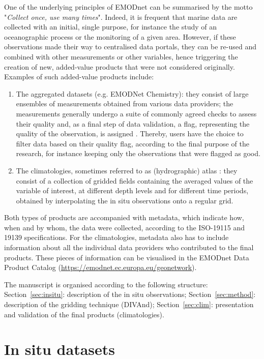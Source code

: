 \documentclass[essd,manuscript]{copernicus}
\begin{document}
One of the underlying principles of EMODnet can be summarised by the motto "\textit{Collect once, use many times}". Indeed, it is frequent that marine data are collected with an initial, single purpose, for instance the study of an oceanographic process or the monitoring of a given area. However, if these observations made their way to centralised data portals, they can be re-used and combined with other measurements or other variables, hence triggering the creation of new, added-value products that were not considered originally. Examples of such added-value products include:
\begin{enumerate}
\item The aggregated datasets (e.g. EMODNet Chemistry): they consist of large ensembles of measurements obtained from various data providers; the measurements generally undergo a suite of commonly agreed checks to assess their quality and, as a final step of data validation, a flag, representing the quality of the observation, is assigned \citep{Lipizer2023}. Thereby, users have the choice to filter data based on their quality flag, according to the final purpose of the research, for instance keeping only the observations that were flagged as good.
\item The climatologies, sometimes referred to as (hydrographic) atlas \citep[e.g.][]{soton16209,Iona_2018}: they consist of a collection of gridded fields containing the averaged values of the variable of interest, at different depth levels and for different time periods, obtained by interpolating the in situ observations onto a regular grid.
\end{enumerate}

Both types of products are accompanied with metadata, which indicate how, when and by whom, the data were collected, according to the ISO-19115 and 19139 specifications. For the climatologies, metadata also has to include information about all the individual data providers who contributed to the final products. These pieces of information can be visualised in the EMODnet Data Product Catalog (\url{https://emodnet.ec.europa.eu/geonetwork}).

The manuscript is organised according to the following structure: Section~\ref{sec:insitu}: description of the in situ observations; Section~\ref{sec:method}: description of the gridding technique (DIVAnd); Section~\ref{sec:clim}: presentation and validation of the final products (climatologies). 


\section{In situ datasets\label{sec:insitu}}
\end{document}
